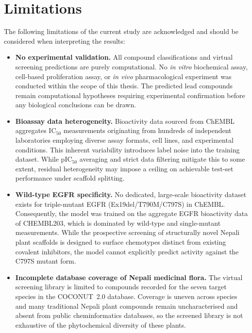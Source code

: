 \section{Limitations}

The following limitations of the current study are acknowledged and should be
considered when interpreting the results:

\begin{itemize}
    \item \textbf{No experimental validation.} All compound classifications and
    virtual screening predictions are purely computational. No \textit{in vitro}
    biochemical assay, cell-based proliferation assay, or \textit{in vivo}
    pharmacological experiment was conducted within the scope of this thesis.
    The predicted lead compounds remain computational hypotheses requiring
    experimental confirmation before any biological conclusions can be drawn.

    \item \textbf{Bioassay data heterogeneity.} Bioactivity data sourced from
    ChEMBL aggregates IC$_{50}$ measurements originating from hundreds of
    independent laboratories employing diverse assay formats, cell lines, and
    experimental conditions. This inherent variability introduces label noise into
    the training dataset. While pIC$_{50}$ averaging and strict data filtering
    mitigate this to some extent, residual heterogeneity may impose a ceiling on
    achievable test-set performance under scaffold splitting.

    \item \textbf{Wild-type EGFR specificity.} No dedicated, large-scale bioactivity
    dataset exists for triple-mutant EGFR (Ex19del/T790M/C797S) in ChEMBL.
    Consequently, the model was trained on the aggregate EGFR bioactivity data of
    CHEMBL203, which is dominated by wild-type and single-mutant measurements. While
    the prospective screening of structurally novel Nepali plant scaffolds is designed
    to surface chemotypes distinct from existing covalent inhibitors, the model cannot
    explicitly predict activity against the C797S mutant form.

    \item \textbf{Incomplete database coverage of Nepali medicinal flora.} The
    virtual screening library is limited to compounds recorded for the seven target
    species in the COCONUT~2.0 database. Coverage is uneven across species and many
    traditional Nepali plant compounds remain uncharacterised and absent from public
    cheminformatics databases, so the screened library is not exhaustive of the
    phytochemical diversity of these plants.


\end{itemize}
